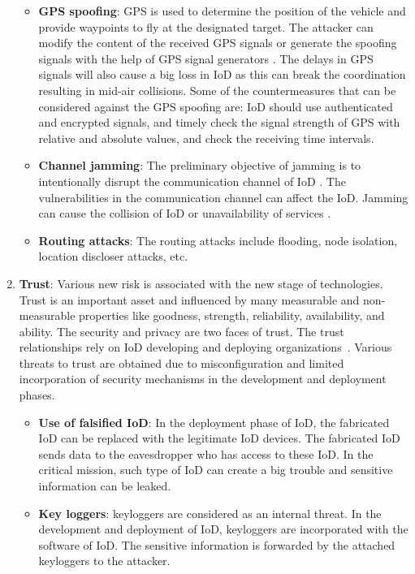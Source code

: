 \documentclass{easychair}
\begin{document}
\begin{enumerate}
\begin{itemize}
  \item \textbf{GPS spoofing}: GPS is used to determine the position of the vehicle and provide waypoints to fly at the designated target. The attacker can modify the content of the received GPS signals or generate the spoofing signals with the help of GPS signal generators \cite{giray2013anatomy}. The delays in GPS signals will also cause a big loss in IoD as this can break the coordination resulting in mid-air collisions. Some of the countermeasures that can be considered against the GPS spoofing are:  IoD should use authenticated and encrypted signals, and timely check the signal strength of GPS with relative and absolute values, and check the receiving time intervals.

 \item \textbf{Channel jamming}: The preliminary objective of jamming is to intentionally disrupt the communication channel of IoD \cite{bhattacharya2010game}. The vulnerabilities in the communication channel can affect the IoD. Jamming can cause the collision of IoD or unavailability of services \cite{rudinskas2009security}.

\item \textbf{Routing attacks}: The routing attacks include flooding, node isolation, location discloser attacks, etc\cite{yampolskiy2013taxonomy}.
 \end{itemize}

  \item
   \textbf{Trust}: Various new risk is associated with the new stage of technologies. Trust is an important asset and influenced by many measurable and non-measurable properties like goodness, strength, reliability, availability, and ability. The security and privacy are two faces of trust. The trust relationships rely on IoD developing and deploying organizations~\cite{oleson2011trust}. Various threats to trust are obtained due to misconfiguration and limited incorporation of security mechanisms in the development and deployment phases.

 \begin{itemize}
   \item \textbf{Use of falsified IoD}: In the deployment phase of IoD, the fabricated IoD can be replaced with the legitimate IoD devices. The fabricated IoD sends data to the eavesdropper who has access to these IoD. In the critical mission, such type of IoD can create a big trouble and sensitive information can be leaked.

    \item \textbf{Key loggers}: keyloggers are considered as an internal threat. In the development and deployment of IoD, keyloggers are incorporated with the software of IoD. The sensitive information is forwarded by the attached keyloggers to the attacker.


\end{itemize}
\end{enumerate}
\end{document}
